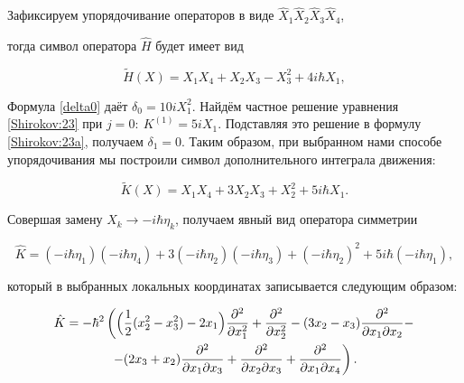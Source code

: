Зафиксируем упорядочивание операторов в виде $\hat X_1\hat X_2\hat X_3\hat X_4$,

тогда символ оператора $ \hat{H} $ будет имеет вид 

\[ 

\tilde{H}(X)=X_1X_4+X_2X_3-X_3^2+4i\hbar X_1,

 \]

Формула \eqref{delta0} даёт  $ \delta_0=10 i X_1^2 $. Найдём частное решение уравнения \eqref{Shirokov:23} при $ j=0:\ K^{(1)}=5 i X_1 $. Подставляя это решение в формулу \eqref{Shirokov:23a}, получаем $ \delta_1=0 $. Таким образом, при выбранном нами способе упорядочивания мы построили символ дополнительного интеграла движения:

\[ 

\tilde{K}(X)=X_1X_4+3X_2X_3+X_2^2+5i\hbar X_1.

 \]

Совершая замену $ X_k\to -i\hbar\eta_k $, получаем явный вид оператора симметрии

\[ 

\hat{K}=(-i\hbar\eta_1)(-i\hbar\eta_4)+3(-i\hbar\eta_2)(-i\hbar\eta_3)+(-i\hbar\eta_2)^2+5i\hbar(-i\hbar\eta_1),

 \]

который в выбранных локальных координатах записывается следующим образом:

\begin{multline*}

\hat{K}=-\hbar^2 \left(

\Bigl(\frac12(x_2^2-x_3^2)-2x_1\Bigr)\dfrac{\partial^2}{\partial x_1^2}

+\frac{\partial^2}{\partial x_2^2}-(3x_2-x_3)\dfrac{\partial^2}{\partial x_1\partial x_2}-\right. \\ 

\left. -(2x_3 +x_2)\dfrac{\partial^2}{\partial x_1\partial x_3}+ \frac{\partial^2}{\partial x_2\partial x_3}+\dfrac{\partial^2}{\partial x_1\partial x_4}\right).

\end{multline*}



